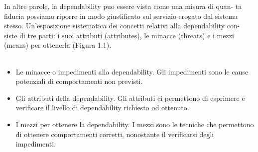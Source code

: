 \documentclass[14pt]{extarticle}
\begin{document}
In altre parole, la dependability puo essere vista come una misura di quan-
ta fiducia possiamo riporre in modo giustificato sul servizio erogato dal sistema
stesso. Un’esposizione sistematica dei concetti relativi alla dependability con-
siste di tre parti: i suoi attributi (attributes), le minacce (threats) e i mezzi
(means) per ottenerla (Figura 1.1).\\\
\begin{itemize}
\item Le minacce o impedimenti alla dependability. Gli impedimenti sono le
cause potenziali di comportamenti non previsti.
\item Gli attributi della dependability. Gli attributi ci permettono di esprimere
e verificare il livello di dependability richiesto od ottenuto.
\item I mezzi per ottenere la dependability. I mezzi sono le tecniche che
permettono di ottenere comportamenti corretti, nonostante il verificarsi
degli impedimenti.
\end{itemize}
\end{document}
